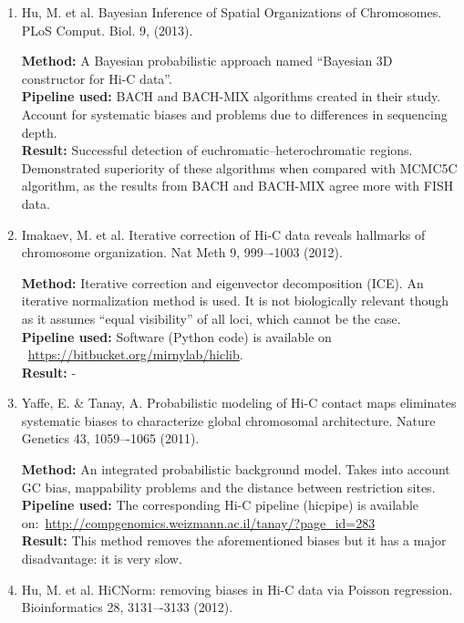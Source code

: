 \documentclass[a4paper,12pt]{article}
\begin{document}
\begin{enumerate}
	\item Hu, M. et al. Bayesian Inference of Spatial Organizations of Chromosomes. PLoS Comput. Biol. 9, (2013).

	\textbf{Method:} A Bayesian probabilistic approach named ``Bayesian 3D constructor for Hi-C data''.\\
	\textbf{Pipeline used:} BACH and BACH-MIX algorithms created in their study.
							Account for systematic biases and problems due to 
							differences in sequencing depth.\\
	\textbf{Result:} Successful detection of euchromatic--heterochromatic regions.\\
					 Demonstrated superiority of these algorithms when compared with MCMC5C algorithm, as the results from BACH and BACH-MIX agree more with FISH data.\\

	\item Imakaev, M. et al. Iterative correction of Hi-C data reveals hallmarks of chromosome organization. Nat Meth 9, 999–-1003 (2012).
    
    \textbf{Method:} Iterative correction and eigenvector decomposition (ICE).
    An iterative normalization method is used. It 
    is not biologically relevant though as it assumes ``equal visibility''
    of all loci, which cannot be the case.\\
	\textbf{Pipeline used:} Software (Python code) is available on ~\url{https://bitbucket.org/mirnylab/hiclib}.\\ 
	\textbf{Result:} - \\

	\item Yaffe, E. \& Tanay, A. Probabilistic modeling of Hi-C contact maps eliminates systematic biases to characterize global chromosomal architecture. Nature Genetics 43, 1059–-1065 (2011).
    
    \textbf{Method:} An integrated probabilistic background model.
    				   Takes into account GC bias, mappability problems and the
    				   distance between restriction sites.\\ 
	\textbf{Pipeline used:} The corresponding Hi-C pipeline (hicpipe) is available on:~\url{http://compgenomics.weizmann.ac.il/tanay/?page_id=283}\\
	\textbf{Result:} This method removes the aforementioned biases but
	it has a major disadvantage: it is very slow.\\

	\item Hu, M. et al. HiCNorm: removing biases in Hi-C data via Poisson regression. Bioinformatics 28, 3131–-3133 (2012).
    

\end{enumerate}
\end{document}
